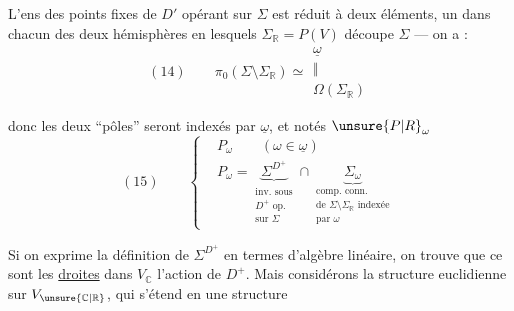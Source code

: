 
L’ens des points fixes de $D'$ opérant sur
$\Sigma$ est  réduit à deux éléments,
un dans chacun des deux hémisphères
en lesquels $\Sigma_{\mathbb R}=P(V)$ découpe $\Sigma$ —
on a :
\[
(14)\qquad \pi_0(\Sigma\setminus\Sigma_{\mathbb R})\simeq
\begin{gathered}\underline\omega\\[-.5ex]\Vert\\[-.5ex]\Omega(\Sigma_{\mathbb R})\end{gathered}
\]

donc les deux “pôles” seront indexés par
$\underline\omega$, et notés $\unsure{P|R}_\omega$
\[
(15)\qquad\left\{
\begin{aligned}
&P_\omega\qquad(\omega\in\underline\omega)\\
&P_\omega=\underbrace{\Sigma^{D^+}}_{\substack{\text{inv. sous}\\D^+\text{ op.}\\\text{sur }\Sigma}}
\cap\underbrace{\Sigma_\omega}_{\substack{\text{comp. conn.}\\\text{de }\Sigma\setminus\Sigma_{\mathbb R}\text{ indexée}\\\text{par }\omega}}
\end{aligned}\right.
\]

Si on exprime la définition de $\Sigma^{D^+}$ en
termes d’algèbre linéaire, on trouve que
ce sont les \uline{droites}  dans $V_{\mathbb C}$
 
l’action de $D^+$. Mais considérons
la  structure euclidienne sur $V_{\unsure{\mathbb C|\mathbb R}}$,
qui  s’étend en une structure

